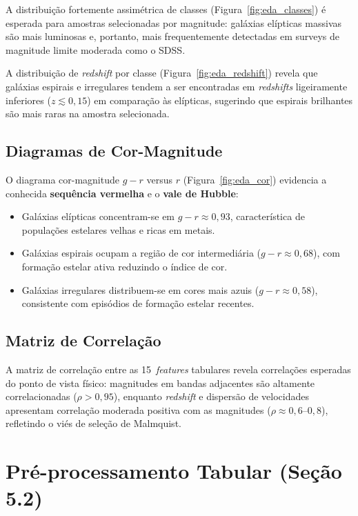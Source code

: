 \documentclass[12pt, a4paper]{article}
\begin{document}
A distribuição fortemente assimétrica de classes (Figura~\ref{fig:eda_classes})
é esperada para amostras selecionadas por magnitude: galáxias elípticas massivas
são mais luminosas e, portanto, mais frequentemente detectadas em surveys de
magnitude limite moderada como o SDSS.

A distribuição de \textit{redshift} por classe (Figura~\ref{fig:eda_redshift})
revela que galáxias espirais e irregulares tendem a ser encontradas em
\textit{redshifts} ligeiramente inferiores ($z \lesssim 0{,}15$) em comparação
às elípticas, sugerindo que espirais brilhantes são mais raras na amostra
selecionada.

\subsection{Diagramas de Cor-Magnitude}

O diagrama cor-magnitude $g-r$ versus $r$ (Figura~\ref{fig:eda_cor}) evidencia
a conhecida \textbf{sequência vermelha} e o \textbf{vale de Hubble}:
\begin{itemize}[leftmargin=2em]
  \item Galáxias elípticas concentram-se em $g-r \approx 0{,}93$,
        característica de populações estelares velhas e ricas em metais.
  \item Galáxias espirais ocupam a região de cor intermediária
        ($g-r \approx 0{,}68$), com formação estelar ativa reduzindo
        o índice de cor.
  \item Galáxias irregulares distribuem-se em cores mais azuis
        ($g-r \approx 0{,}58$), consistente com episódios de formação estelar
        recentes.
\end{itemize}

\subsection{Matriz de Correlação}

A matriz de correlação entre as 15~\textit{features} tabulares revela correlações
esperadas do ponto de vista físico: magnitudes em bandas adjacentes são altamente
correlacionadas ($\rho > 0{,}95$), enquanto \textit{redshift} e dispersão de
velocidades apresentam correlação moderada positiva com as magnitudes ($\rho
\approx 0{,}6$--$0{,}8$), refletindo o viés de seleção de Malmquist.

\section{Pré-processamento Tabular (Seção 5.2)}
\end{document}
